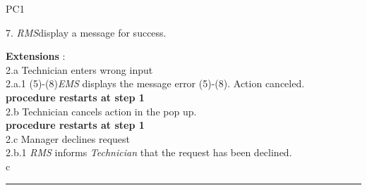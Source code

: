 \begin{lyxlist}{PC1}
{7. \emph{RMS}display a message for success.\\
\item [\textbf{Extensions}]:\\
2.a Technician enters wrong input\\
\hspace*{0.5cm} 2.a.1 (5)-(8)\emph{EMS} displays the message error (5)-(8).
Action canceled.\\
\hspace*{0.5cm} \textbf{procedure restarts at step 1}\\
2.b Technician cancels action in the pop up.\\
\hspace*{0.5cm} \textbf{procedure restarts at step 1}\\
2.c Manager declines request\\
\hspace*{0.5cm} 2.b.1 \emph{RMS} informs \emph{Technician} that the request
has been declined.\\
c
}
\end{lyxlist}
\hrule
\vspace{0.5cm}

\break


